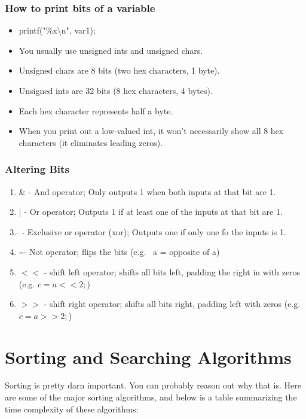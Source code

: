 \documentclass[a4paper,12pt]{report}
\begin{document}
\subsection{How to print bits of a variable}
\begin{itemize}
\item printf("\%x\textbackslash n", var1);
\item You usually use unsigned ints and unsigned chars.
\item Unsigned chars are 8 bits (two hex characters, 1 byte). 
\item Unsigned ints are 32 bits (8 hex characters, 4 bytes).  
\item Each hex character represents half a byte.
\item When you print out a low-valued int, it won't necessarily show all 8 hex characters (it eliminates leading zeros).
\end{itemize}

\subsection{Altering Bits}
\begin{enumerate}
\item \& - And operator; Only outputs 1 when both inputs at that bit are 1.
\item $|$ - Or operator; Outputs 1 if at least one of the inputs at that bit are 1. 
\item $\hat{}$ - Exclusive or operator (xor); Outputs one if only one fo the inputs is 1. 
\item \textasciitilde - Not operator; flips the bits (e.g. ~a = opposite of a)
\item $<<$ - shift left operator; shifts all bits left, padding the right in with zeros (e.g. $c = a << 2;$)
\item $>>$ - shift right operator; shifts all bits right, padding left with zeros (e.g. $c = a >> 2;$)
\end{enumerate}

\chapter{Sorting and Searching Algorithms}
Sorting is pretty darn important. You can probably reason out why that is. Here are some of the major sorting algorithms, and below is a table summarizing the time complexity of these algorithms: 
\end{document}
